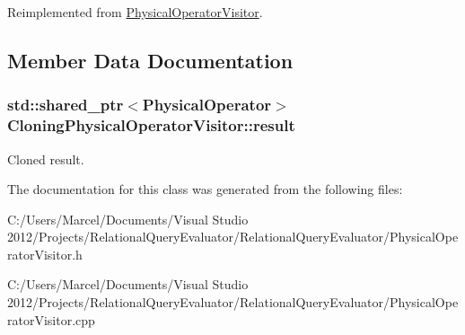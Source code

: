 Reimplemented from \hyperlink{class_physical_operator_visitor_adbb3e6618904bc7e6d0b6aa3958132e9}{Physical\+Operator\+Visitor}.



\subsection{Member Data Documentation}
\hypertarget{class_cloning_physical_operator_visitor_aa3705b767976ef07fdfe39458543138e}{
\subsubsection[{result}]{\setlength{\rightskip}{0pt plus 5cm}std\+::shared\+\_\+ptr$<${\bf Physical\+Operator}$>$ Cloning\+Physical\+Operator\+Visitor\+::result}}\label{class_cloning_physical_operator_visitor_aa3705b767976ef07fdfe39458543138e}
Cloned result. 

The documentation for this class was generated from the following files\+:\begin{DoxyCompactItemize}
\item 
C\+:/\+Users/\+Marcel/\+Documents/\+Visual Studio 2012/\+Projects/\+Relational\+Query\+Evaluator/\+Relational\+Query\+Evaluator/Physical\+Operator\+Visitor.\+h\item 
C\+:/\+Users/\+Marcel/\+Documents/\+Visual Studio 2012/\+Projects/\+Relational\+Query\+Evaluator/\+Relational\+Query\+Evaluator/Physical\+Operator\+Visitor.\+cpp\end{DoxyCompactItemize}

